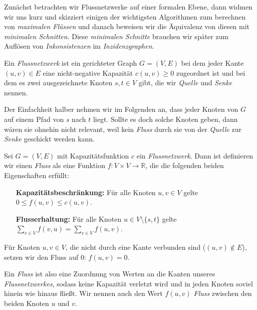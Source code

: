 Zunächst betrachten wir Flussnetzwerke auf einer formalen Ebene, dann widmen wir uns kurz und skizziert einigen der wichtigsten Algorithmen zum berechnen von \emph{maximalen Flüssen} und danach beweisen wir die Äquivalenz von diesen mit \emph{minimalen Schnitten}. Diese \emph{minimalen Schnitte} brauchen wir später zum Auflösen von \emph{Inkonsistenzen} im \emph{Inzidenzgraphen}.

\begin{definition}[Flussnetzwerk]
	Ein \emph{Flussnetzwerk} ist ein gerichteter Graph $G = (V,E)$ bei dem jeder Kante $(u,v) \in E$ eine nicht-negative Kapazität $c(u,v) \geq 0$ zugeordnet ist und bei dem es zwei ausgezeichnete Knoten $s, t \in V$ gibt, die wir \emph{Quelle} und \emph{Senke} nennen.  
\end{definition}

Der Einfachheit halber nehmen wir im Folgenden an, dass jeder Knoten von $G$ auf einem Pfad von $s$ nach $t$ liegt. Sollte es doch solche Knoten geben, dann wären sie ohnehin nicht relevant, weil kein \emph{Fluss} durch sie von der \emph{Quelle} zur \emph{Senke} geschickt werden kann.

\begin{definition}[Fluss]
	Sei $G = (V,E)$ mit Kapazitätsfunktion $c$ ein \emph{Flussnetzwerk}. Dann ist definieren wir einen \emph{Fluss} als eine Funktion $f: V \times V \rightarrow \mathbb{R}$, die die folgenden beiden Eigenschaften erfüllt:
	\begin{itemize}[leftmargin=12em]
		\item[\textbf{Kapazitätsbeschränkung:}] Für alle Knoten $u,v \in V$ gelte $0 \leq f(u,v) \leq c(u,v)$.
		\item[\textbf{Flusserhaltung:}] Für alle Knoten $u \in V\setminus\{s,t\}$ gelte \\ 
			$\sum_{v \in V}{f(v,u)} = \sum_{v \in V}{f(u,v)}$.
	\end{itemize} 
	Für Knoten $u,v\in V$, die nicht durch eine Kante verbunden sind ($(u,v)\notin E$), setzen wir den Fluss auf 0: $f(u,v) = 0$.
\end{definition}

Ein \emph{Fluss} ist also eine Zuordnung von Werten an die Kanten unseres \emph{Flussnetzwerkes}, sodass keine Kapazität verletzt wird und in jeden Knoten soviel hinein wie hinaus fließt. Wir nennen auch den Wert $f(u,v)$ \emph{Fluss} zwischen den beiden Knoten $u$ und $v$.


